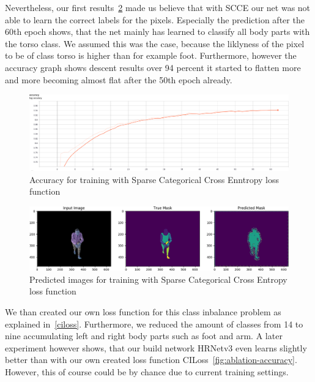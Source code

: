 Nevertheless, our first results~\ref{fig:cross_entropy_pred_img} made us believe that with SCCE our net was not able to
learn the correct labels for the pixels.
Especially the prediction after the 60th epoch shows, that the net mainly has learned to classify all body parts with the
torso class.
We assumed this was the case, because the liklyness of the pixel to be of class torso is higher than for
example foot.
Furthermore, however the accuracy graph shows descent results over 94 percent it started to flatten more and more becoming
almost flat after the 50th epoch already.
\begin{figure}[H]
    \centering
    \includegraphics[width=\textwidth,height=\textheight,keepaspectratio]{Figures/accuracy_cross_entropy.png}
    \decoRule
    \caption[SCCE: Accuracy]{Accuracy for training with Sparse Categorical Cross Enntropy loss function}
    \label{fig:accuracy_cross_entropy}
\end{figure}
\begin{figure}[H]
    \centering
    \includegraphics[width=\textwidth,height=\textheight,keepaspectratio]{Figures/crossentropy_imgs_prediction_last_epoch.png}
    \decoRule
    \caption[SCCE: predictions]{Predicted images for training with Sparse Categorical Cross Entropy loss function}
    \label{fig:cross_entropy_pred_img}
\end{figure}
We than created our own loss function for this class inbalance problem as explained in~\autoref{ciloss}.
Furthermore, we reduced the amount of classes from 14 to nine accumulating left and right body parts such as foot and arm.
A later experiment however shows, that our build network HRNetv3 even learns slightly better than with our own created
loss function CILoss~\ref{fig:ablation-accuracy}.
However, this of course could be by chance due to current training settings.


